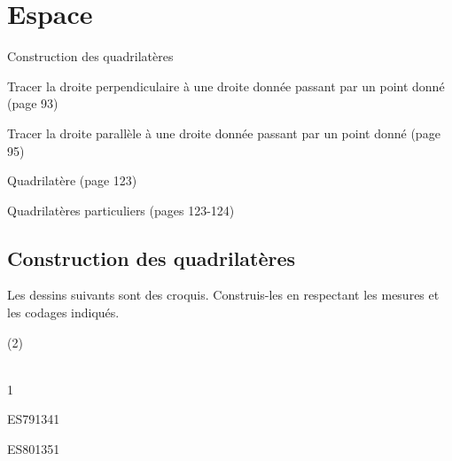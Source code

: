\documentclass[a4paper,11pt]{report}
\begin{document}
\newcommand{\chapterName}{Espace}
\newcommand{\serieName}{Construction des quadrilatères}


\chapter*{\chapterName}
\thispagestyle{empty}

\begin{amL}{\serieName}{
\item Tracer la droite perpendiculaire à une droite donnée passant par un point donné (page 93)
\item Tracer la droite parallèle à une droite donnée passant par un point donné (page 95)
\item Quadrilatère (page 123)
\item Quadrilatères particuliers (pages 123-124)
}
\end{amL}

\section*{\serieName}
\setcounter{page}{1}
\thispagestyle{firstPage}






\begin{exo}{
Les dessins suivants sont des croquis. Construis-les en respectant les mesures et les codages indiqués.
\begin{tasks}(2)
    \task ~\\ 
    \task ~\\ 
\end{tasks}
}{1}
\end{exo}



\begin{exof}{ES79}{134}{1}
\end{exof}
\begin{exof}{ES80}{135}{1}
\end{exof}
\end{document}
